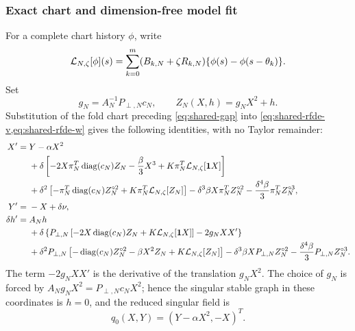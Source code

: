 \subsubsection{Exact chart and dimension-free model fit}

For a complete chart history \(\phi\), write
\[
 \mathcal L_{N,\zeta}[\phi](s)
 =\sum_{k=0}^m(B_{k,N}+\zeta R_{k,N})
       \{\phi(s)-\phi(s-\theta_k)\}.
\]
Set
\[
 g_N=A_N^{-1}P_{\perp,N}c_N,
 \qquad Z_N(X,h)=g_NX^2+h.
\]
Substitution of the fold chart preceding \cref{eq:shared-gap} into
\cref{eq:shared-rfde-v,eq:shared-rfde-w} gives the following identities,
with no Taylor remainder:
\begin{align}
 X'={}&Y-\alpha X^2\notag\\
 &+\delta\left[-2X\pi_N^T\operatorname{diag}(c_N)Z_N
          -\frac\beta3X^3
          +K\pi_N^T\mathcal L_{N,\zeta}[\mathbf1X]\right]\notag\\
 &+\delta^2\left[-\pi_N^T\operatorname{diag}(c_N)Z_N^{\circ2}
          +K\pi_N^T\mathcal L_{N,\zeta}[Z_N]\right]
 -\delta^3\beta X\pi_N^TZ_N^{\circ2}
 -\frac{\delta^4\beta}{3}\pi_N^TZ_N^{\circ3},
                                                               \label{eq:shared-exact-X}\\
 Y'={}&-X+\delta\nu,                                  \label{eq:shared-exact-Y}\\
 \delta h'={}&A_Nh\notag\\
 &+\delta\left\{P_{\perp,N}\left[-2X\operatorname{diag}(c_N)Z_N
               +K\mathcal L_{N,\zeta}[\mathbf1X]\right]
               -2g_NX X'\right\}\notag\\
 &+\delta^2P_{\perp,N}\left[-\operatorname{diag}(c_N)Z_N^{\circ2}
             -\beta X^2Z_N+K\mathcal L_{N,\zeta}[Z_N]\right]
 -\delta^3\beta X P_{\perp,N}Z_N^{\circ2}
 -\frac{\delta^4\beta}{3}P_{\perp,N}Z_N^{\circ3}.
                                                               \label{eq:shared-exact-h}
\end{align}
The term \(-2g_NXX'\) is the derivative of the translation \(g_NX^2\).
The choice of \(g_N\) is forced by
\(A_Ng_NX^2=P_{\perp,N}c_NX^2\); hence the singular stable graph in these
coordinates is \(h=0\), and the reduced singular field is
\[
 q_0(X,Y)=(Y-\alpha X^2,-X)^T.
\]

